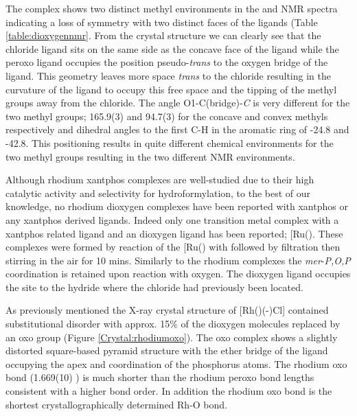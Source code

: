 The complex shows two distinct methyl environments in the \proton{} and \carbon{} NMR spectra indicating a loss of symmetry with two distinct faces of the \tBuxantphos{} ligands (Table \ref{table:dioxygennmr}.  From the crystal structure we can clearly see that the chloride ligand sits on the same side as the concave face of the ligand while the peroxo ligand occupies the position pseudo-\emph{trans} to the oxygen bridge of the ligand.  This geometry leaves more space \emph{trans} to the chloride resulting in the curvature of the ligand to occupy this free space and the tipping of the methyl groups away from the chloride.  The angle O1-C(bridge)-\emph{C} is very different for the two methyl groups; 165.9(3) and 94.7(3) for the concave and convex methyls respectively and dihedral angles to the first C-H in the aromatic ring of -24.8 and -42.8\degrees.  This positioning results in quite different chemical environments for the two methyl groups resulting in the two different NMR environments.  

Although rhodium xantphos{} complexes are well-studied due to their high catalytic activity and selectivity for hydroformylation, to the best of our knowledge, no rhodium dioxygen complexes have been reported with xantphos or any xantphos derived ligands.  Indeed only one transition metal complex with a xantphos related ligand and an  dioxygen ligand has been reported; [Ru(\Phxantphos)\ce{(PPh3)(\hapto{2}-O2)H]BAr4^F}.\cite{Ledger2010}  These complexes were formed by reaction of the [Ru(\Phxantphos)\ce{PPh3HCl]} with  followed by filtration then stirring in the air for 10 mins.  Similarly to the rhodium \tBuxantphos{} complexes the \emph{mer}-\dento{}\emph{P,O,P} coordination is retained upon reaction with oxygen.  The dioxygen ligand occupies the site \trans{} to the hydride where the chloride had previously been located.  

As previously mentioned the X-ray crystal structure of [Rh(\tBuxantphos)(-)Cl] contained substitutional disorder with approx. 15\%{} of the dioxygen molecules replaced by an oxo group (Figure \ref{Crystal:rhodiumoxo}).  The oxo complex shows a slightly distorted square-based pyramid structure with the ether bridge of the \tBuxantphos ligand occupying the apex and \trans{} coordination of the phosphorus atoms.  The rhodium oxo bond (1.669(10) \A) is much shorter than the rhodium peroxo bond lengths consistent with a higher bond order.  In addition the rhodium oxo bond is the shortest crystallographically determined Rh-O bond.  

